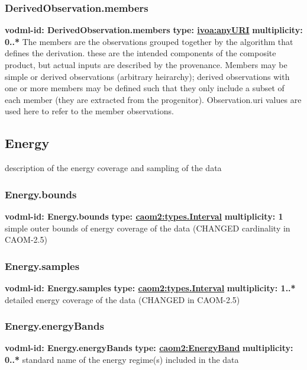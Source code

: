     \subsubsection{DerivedObservation.members}
      \textbf{vodml-id: DerivedObservation.members} \newline
      \textbf{type: \hyperref[sect:ivoa]{ivoa:anyURI}} \newline
      \textbf{multiplicity: 0..*} \newline
      The members are the observations grouped together by the algorithm that defines the derivation. these are the intended components of the composite product, but actual inputs are described by the provenance. Members may be simple or derived observations (arbitrary heirarchy); derived observations with one or more members may be defined such that they only include a subset of each member (they are extracted from the progenitor). Observation.uri values are used here to refer to the member observations.

  \subsection{Energy}
  \label{sect:Energy}
    description of the energy coverage and sampling of the data

    \subsubsection{Energy.bounds}
      \textbf{vodml-id: Energy.bounds} \newline
      \textbf{type: \hyperref[sect:types.Interval]{caom2:types.Interval}} \newline
      \textbf{multiplicity: 1} \newline
      simple outer bounds of energy coverage of the data (CHANGED cardinality in CAOM-2.5)

    \subsubsection{Energy.samples}
      \textbf{vodml-id: Energy.samples} \newline
      \textbf{type: \hyperref[sect:types.Interval]{caom2:types.Interval}} \newline
      \textbf{multiplicity: 1..*} \newline
      detailed energy coverage of the data (CHANGED in CAOM-2.5)

    \subsubsection{Energy.energyBands}
      \textbf{vodml-id: Energy.energyBands} \newline
      \textbf{type: \hyperref[sect:EnergyBand]{caom2:EnergyBand}} \newline
      \textbf{multiplicity: 0..*} \newline
      standard name of the energy regime(s) included in the data

